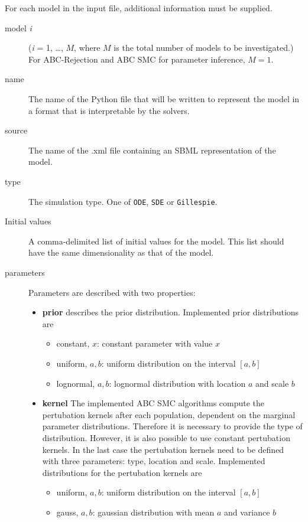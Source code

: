 \documentclass[a4paper]{report}
\begin{document}
For each model in the input file, additional information must be supplied.
\begin{description}
\item[model {\it i}] ({\it i} = 1, \dots, $M$, where $M$ is the total number of models to be investigated.) For ABC-Rejection and ABC SMC for parameter inference, $M = 1$.
\item[name] The name of the Python file that will be written to represent the model in a format that is interpretable by the solvers.
\item[source] The name of the .xml file containing an SBML representation of the model.
\item[type] The simulation type. One of \verb$ODE$, \verb$SDE$ or \verb$Gillespie$.
\item[Initial values] A comma-delimited list of initial values for the model. This list should have the same dimensionality as that of the model.
\item[parameters] Parameters are described with two properties:
\begin{itemize}
\item \textbf{prior} describes the prior distribution. Implemented prior distributions are
\begin{itemize}
\item constant, $x$: constant parameter with value $x$
\item uniform, $a, b$: uniform distribution on the interval $[a, b]$
\item lognormal, $a, b$: lognormal distribution with location $a$ and scale $b$ 
\end{itemize}
\item \textbf{kernel} The implemented ABC SMC algorithms compute the pertubation kernels after each population, dependent on the marginal parameter distributions. Therefore it is necessary to provide the type of distribution. However, it is also possible to use constant pertubation kernels. In the last case the pertubation kernels need to be defined with three parameters: type, location and scale. Implemented distributions for the pertubation kernels are
\begin{itemize}
\item uniform, $a, b$: uniform distribution on the interval $[a, b]$
\item gauss, $a, b$: gaussian distribution with mean $a$ and variance $b$
\end{itemize}
\end{itemize}
\end{description}
\end{document}
